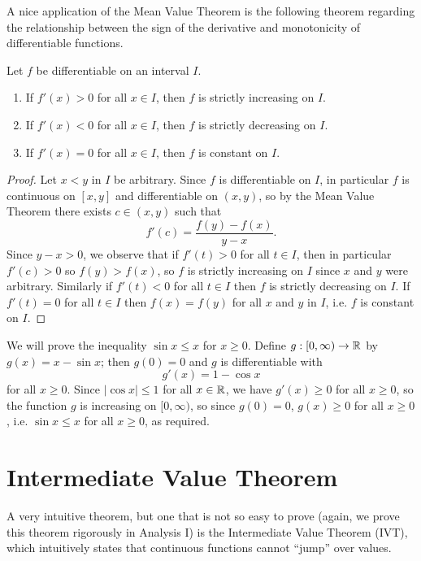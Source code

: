 \documentclass[../calculus.tex]{subfiles}
\begin{document}
A nice application of the Mean Value Theorem is the following theorem regarding the relationship between the sign of the derivative and monotonicity of differentiable functions.
\begin{theorem}
    \begin{shaded*}
        Let $f$ be differentiable on an interval $I$.
        \begin{enumerate}
            \item If $f'(x) > 0$ for all $x \in I$, then $f$ is strictly increasing on $I$.
            \item If $f'(x) < 0$ for all $x \in I$, then $f$ is strictly decreasing on $I$.
            \item If $f'(x) = 0$ for all $x \in I$, then $f$ is constant on $I$.
        \end{enumerate}
    \end{shaded*}
\end{theorem}
\begin{proof}
    Let $x<y$ in $I$ be arbitrary. Since $f$ is differentiable on $I$, in particular $f$ is continuous on $[x,y]$ and differentiable on $(x,y)$, so by the Mean Value Theorem there exists $c\in(x,y)$ such that \[f'(c)=\frac{f(y)-f(x)}{y-x}.\]
    Since $y-x>0$, we observe that if $f'(t)>0$ for all $t\in I$, then in particular $f'(c)>0$ so $f(y)>f(x)$, so $f$ is strictly increasing on $I$ since $x$ and $y$ were arbitrary. Similarly if $f'(t)<0$ for all $t\in I$ then $f$ is strictly decreasing on $I$. If $f'(t)=0$ for all $t\in I$ then $f(x)=f(y)$ for all $x$ and $y$ in $I$, i.e. $f$ is constant on $I$.\qedhere 
\end{proof}

\begin{example}
    We will prove the inequality $\sin x\le x$ for $x\ge 0$. Define $g:[0,\infty)\to\mathbb{R}$ by $g(x)=x-\sin x$; then $g(0)=0$ and $g$ is differentiable with \[g'(x)=1-\cos x\]for all $x\ge 0$. Since $|\cos x|\le 1$ for all $x\in\mathbb{R}$, we have $g'(x)\ge 0$ for all $x\ge 0$, so the function $g$ is increasing on $[0,\infty)$, so since $g(0)=0$, $g(x)\ge 0$ for all $x\ge 0$, i.e. $\sin x\le x$ for all $x\ge 0$, as required.
\end{example}

\section{Intermediate Value Theorem}

A very intuitive theorem, but one that is not so easy to prove (again, we prove this theorem rigorously in Analysis I) is the Intermediate Value Theorem (IVT), which intuitively states that continuous functions cannot ``jump'' over values.
\end{document}
